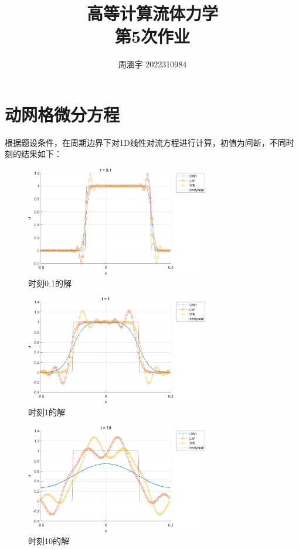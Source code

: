 \documentclass[UTF8,zihao=5]{ctexart} %
\title{{\bfseries\rmfamily\Huge{高等计算流体力学\hspace{1em}\\第5次作业}}}
\author{周涵宇 2022310984}
\date{}
\begin{document}
\maketitle

\section{动网格微分方程}

根据题设条件，在周期边界下对1D线性对流方程进行计算，初值为间断，不同时刻的结果如下：

\begin{figure}[H]
    \centering
    \includegraphics[width=8cm]{T01.png}  %
    \caption{时刻0.1的解}
\end{figure}

\begin{figure}[H]
    \centering
    \includegraphics[width=8cm]{T1.png}  %
    \caption{时刻1的解}
\end{figure}

\begin{figure}[H]
    \centering
    \includegraphics[width=8cm]{T10.png}  %
    \caption{时刻10的解}
\end{figure}
\end{document}
